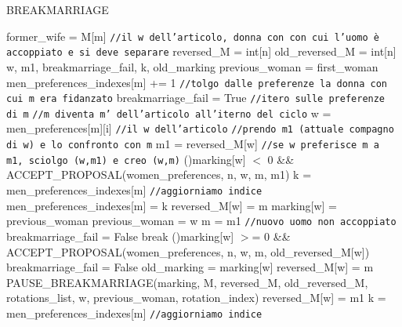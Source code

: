 \documentclass[12pt]{article}
\begin{document}
    \begin{algorithm}[H]
        \scriptsize
        \DontPrintSemicolon
        \caption{BREAKMARRIAGE}\label{alg:BreakMarriage}
        \;
        former\_wife = M[m] \texttt{//il w dell'articolo, donna con con cui l'uomo è accoppiato e si deve separare}\;
        reversed\_M = int[n]\;
        old\_reversed\_M = int[n]\;
        w, m1, breakmarriage\_fail, k, old\_marking\;
        previous\_woman = first\_woman\;
        \;
        men\_preferences\_indexes[m] += 1 \texttt{//tolgo dalle preferenze la donna con cui m era fidanzato}\;
        \;
         {
            breakmarriage\_fail = True\;
            \texttt{//itero sulle preferenze di m}\;
		\texttt{//m diventa m' dell'articolo all'iterno del ciclo}\;
		 {
                w = men\_preferences[m][i] \texttt{//il w dell'articolo}\;
                \texttt{//prendo m1 (attuale compagno di w) e lo confronto con m}\;
                m1 = reversed\_M[w]\;
                \texttt{//se w preferisce m a m1, sciolgo (w,m1) e creo (w,m)}\;
			\If(){marking[w] $<$ 0 \&\& ACCEPT\_PROPOSAL(women\_preferences, n, w, m, m1)} {
                    k = men\_preferences\_indexes[m] \texttt{//aggiorniamo indice}\;
                    men\_preferences\_indexes[m] = k\;
                    reversed\_M[w] = m\;
                    marking[w] = previous\_woman\;
                    previous\_woman = w\;
                    m = m1 \texttt{//nuovo uomo non accoppiato}\;
                    breakmarriage\_fail = False\;
                    break\;
			} \ElseIf(){marking[w] $>$= 0 \&\& ACCEPT\_PROPOSAL(women\_preferences, n, w, m, old\_reversed\_M[w])} { 
                    breakmarriage\_fail = False\;
                    old\_marking = marking[w]\;
                    reversed\_M[w] = m\;
                    PAUSE\_BREAKMARRIAGE(marking, M, reversed\_M, old\_reversed\_M, rotations\_list, w, previous\_woman, rotation\_index)\;
                    reversed\_M[w] = m1\;
                    \;
                    k = men\_preferences\_indexes[m] \texttt{//aggiorniamo indice}\;
    			 {
}}}}
\end{algorithm}
\end{document}

